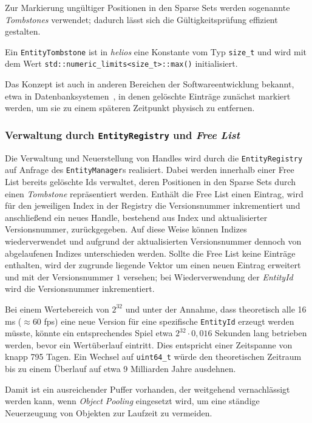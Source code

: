 Zur Markierung ungültiger Positionen in den Sparse Sets werden sogenannte \textit{Tombstones} verwendet; dadurch lässt sich die Gültigkeitsprüfung effizient gestalten.

\vspace{5mm}
\begin{tcolorbox}[colback=black!5, colframe=black, title={Tombstones als Markierung für verworfene Einträge}]
    Ein \texttt{EntityTombstone} ist in \textit{helios} eine Konstante vom Typ \texttt{size\_t} und wird mit dem Wert \texttt{std::numeric\_limits<size\_t>::max()} initialisiert.

    Das Konzept ist auch in anderen Bereichen der Softwareentwicklung bekannt, etwa in Datenbanksystemen~\cite{TombstoneApacheCassandra}, in denen gelöschte Einträge zunächst markiert werden, um sie zu einem späteren Zeitpunkt physisch zu entfernen.
\end{tcolorbox}
\vspace{5mm}

\subsubsection{Verwaltung durch \texttt{EntityRegistry} und \textit{Free List}}

Die Verwaltung und Neuerstellung von Handles wird durch die \texttt{EntityRegistry} auf Anfrage des \texttt{EntityManager}s realisiert.
Dabei werden innerhalb einer Free List bereits gelöschte Ids verwaltet, deren Positionen in den Sparse Sets durch einen \textit{Tombstone} repräsentiert werden.
Enthält die Free List einen Eintrag, wird für den jeweiligen Index in der Registry die Versionsnummer inkrementiert und anschließend ein neues Handle, bestehend aus Index und aktualisierter Versionsnummer, zurückgegeben.
Auf diese Weise können Indizes wiederverwendet und aufgrund der aktualisierten Versionsnummer dennoch von abgelaufenen Indizes unterschieden werden.
Sollte die Free List keine Einträge enthalten, wird der zugrunde liegende Vektor um einen neuen Eintrag erweitert und mit der Versionsnummer $1$ versehen; bei Wiederverwendung der \textit{EntityId} wird die Versionsnummer inkrementiert.

\vspace{5mm}
\begin{tcolorbox}[colback=black!5, colframe=black, title={Wertebereich von \texttt{EntityId}}]
    Bei einem Wertebereich von $2^{32}$ und unter der Annahme, dass theoretisch alle 16\,ms ($\approx 60$ fps) eine neue Version für eine spezifische \texttt{EntityId} erzeugt werden müsste, könnte ein entsprechendes Spiel etwa $2^{32} \cdot 0{,}016$ Sekunden lang betrieben werden, bevor ein Wertüberlauf eintritt.
    Dies entspricht einer Zeitspanne von knapp 795 Tagen.
    Ein Wechsel auf \texttt{uint64\_t} würde den theoretischen Zeitraum bis zu einem Überlauf auf etwa 9 Milliarden Jahre ausdehnen.

    Damit ist ein ausreichender Puffer vorhanden, der weitgehend vernachlässigt werden kann, wenn \textit{Object Pooling} eingesetzt wird, um eine ständige Neuerzeugung von Objekten zur Laufzeit zu vermeiden.
\end{tcolorbox}
\vspace{5mm}
